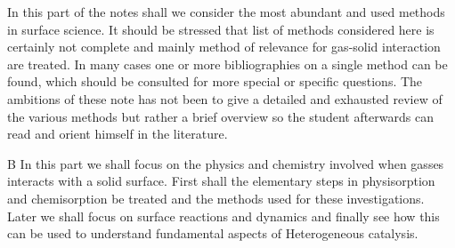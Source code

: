 In this part of the notes shall we consider the most abundant and used methods in surface science. It should be stressed that list of methods considered here is certainly not complete and mainly method of relevance for gas-solid interaction are treated. In many cases one or more bibliographies on a single method can be found, which should be consulted for more special or specific questions. The ambitions of these note has not been to give a detailed and exhausted review of the various methods but rather a brief overview so the student afterwards can read and orient himself in the literature.


B
In this part we shall focus on the physics and chemistry involved when gasses interacts with a solid surface. First shall the elementary steps in physisorption and chemisorption be treated and the methods used for these investigations. Later we shall focus on surface reactions and dynamics and finally see how this can be used to understand fundamental aspects of Heterogeneous catalysis.
